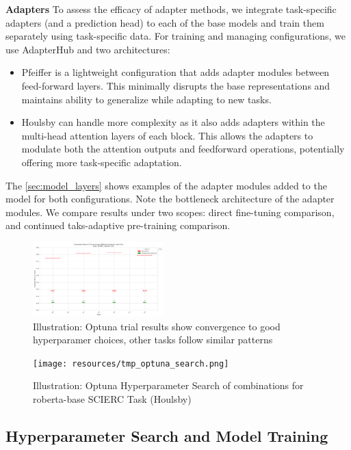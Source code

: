 \documentclass[10pt,twocolumn,letterpaper]{article}
\begin{document}
\textbf{Adapters}  To assess the efficacy of adapter methods, we integrate task-specific adapters (and a prediction head) to each of the base models and train them separately using task-specific data. For training and managing configurations, we use AdapterHub \cite{adapterhub_overview} and two architectures: 
\begin{itemize}
\item Pfeiffer \cite{pfeiffer2020adapterhub} is a lightweight configuration that adds adapter modules between feed-forward layers. This minimally disrupts the base representations and maintains ability to generalize while adapting to new tasks. 
\item Houlsby \cite{houlsby2019parameter} can handle more complexity as it also adds adapters within the multi-head attention layers of each block. This allows the adapters to modulate both the attention outputs and feedforward operations, potentially offering more task-specific adaptation.
\end{itemize}
The \ref{sec:model_layers} shows examples of the adapter modules added to the model for both configurations. Note the bottleneck architecture of the adapter modules. We compare results under two scopes: direct fine-tuning comparison, and continued taks-adaptive pre-training comparison.


\begin{figure}[h]
    \centering 
    \includegraphics[width=0.45\textwidth]{resources/SCIERC/v01/evaluation_macro_f1_across_seeds.png}
    \caption{Illustration: Optuna trial results show convergence to good hyperparamer choices, other tasks follow similar patterns}
    \label{fig:optuna_search_trials}
\end{figure}

\begin{figure}[h]
    \centering 
    \texttt{[image: resources/tmp\_optuna\_search.png]}
    \caption{Illustration: Optuna Hyperparameter Search of combinations for roberta-base SCIERC Task (Houlsby)}
    \label{fig:optuna_search}
\end{figure}

\subsection{Hyperparameter Search and Model Training} 
\end{document}
